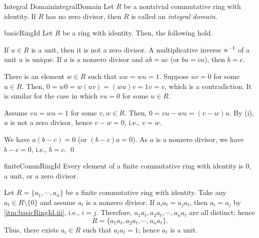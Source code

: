 \documentclass[../modern_algebra.tex]{subfiles}
\begin{document}
\begin{Definition}[colbacktitle=red!75!black]{Integral Domain}{integralDomain}
    Let \(R\) be a nontrivial commutative ring with identity.
    If \(R\) has no zero divisor, then \(R\) is called an \textit{integral domain}.
\end{Definition}

\begin{Theorem}{\textsf{}}{basicRingId}
    Let \(R\) be a ring with identity. Then, the following hold.
    \begin{enumerate}[nolistsep, label=(\roman*), ref=\protect{\Cref{th:basicRingId} (\roman*)}]
        \ii\label{itm:basicRingId.i}
        If \(u \in R\) is a unit, then it is not a zero divisor.
        \ii\label{itm:basicRingId.ii}
        A multiplicative inverse \(u^{-1}\) of a unit \(u\) is unique.
        \ii\label{itm:basicRingId.iii}
        If \(a\) is a nonzero divisor and \(ab = ac\) (or \(ba = ca\)), then \(b = c\).
    \end{enumerate}
\end{Theorem}
\begin{myclaim}[Proof]\hfill
\begin{enumerate}[nolistsep, label=(\roman*), listparindent=\parindent]
    \ii
    There is an element \(w \in R\) such that \(uw = wu = 1\).
    Suppose \(uv = 0\) for some \(u \in R\).
    Then, \(0 = w0 = w(uv) = (wu)v = 1v = v\), which is a contradiction.
    It is similar for the case in which \(vu = 0\) for some \(u \in R\).

    \ii
    Assume \(vu = wu = 1\) for some \(v, w \in R\).
    Then, \(0 = vu - wu = (v - w)u\).
    By (i), \(u\) is not a zero divisor, hence \(v - w = 0\), i.e., \(v = w\).

    \ii
    We have \(a(b-c) = 0\) (or \((b - c)a = 0\)).
    As \(a\) is a nonzero divisor, we have \(b - c = 0\), i.e., \(b = c\).
    \qed
\end{enumerate}
\end{myclaim}

\begin{Theorem}{\textsf{}}{finiteCommRingId}
    Every element of a finite commutative ring with identity is
    \(0\), a unit, or a zero divisor.
\end{Theorem}
\begin{myproof}[Proof]
    Let \(R = \{a_1, \cdots, a_n\}\) be a finite commutative ring with identity.
    Take any \(a_t \in R \setminus \{0\}\) and assume \(a_t\) is a nonzero divisor.
    If \(a_i a_t = a_j a_t\), then \(a_i = a_j\) by \ref{itm:basicRingId.iii}, i.e., \(i = j\).
    Therefore, \(a_1 a_t, a_2 a_t, \cdots, a_n a_t\) are all distinct;
    hence \[
        R = \{a_1 a_t, a_2 a_t, \cdots, a_n a_t\}.
    \]
    Thus, there exists \(a_i \in R\) such that \(a_i a_t = 1\);
    hence \(a_t\) is a unit.
\end{myproof}
\end{document}
